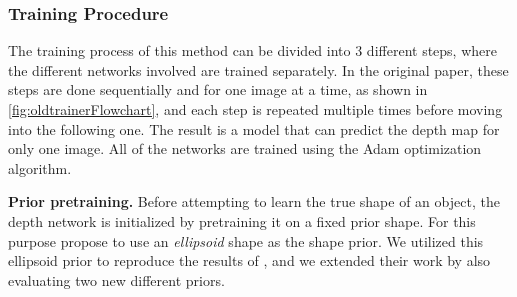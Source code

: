 \subsubsection{Training Procedure}
\label{sec:train}
The training process of this method can be divided into 3 different steps, where the different networks involved are trained separately. In the original paper, these steps are done sequentially and for one image at a time, as shown in \autoref{fig:oldtrainerFlowchart}, and each step is repeated multiple times before moving into the following one. The result is a model that can predict the depth map for only one image. All of the networks are trained using the Adam optimization algorithm.

\textbf{Prior pretraining.} Before attempting to learn the true shape of an object, the depth network is initialized by pretraining it on a fixed prior shape. 
For this purpose \textcite{gan2shape} propose to use an \textit{ellipsoid} shape as the shape prior. 
We utilized this ellipsoid prior to reproduce the results of \textcite{gan2shape}, and we extended their work by also evaluating two new different priors. 

